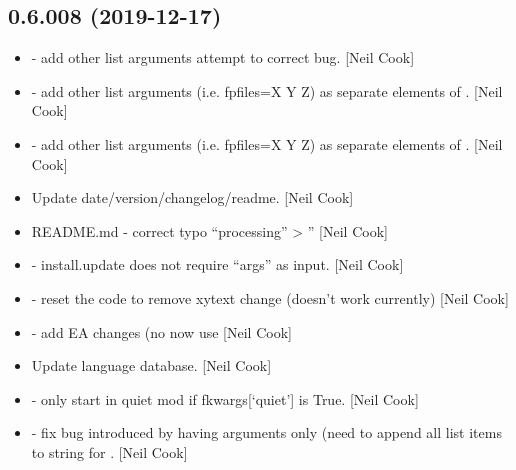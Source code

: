 \documentclass[a4paper,10pt,english]{report}
\begin{document}
\subsection{0.6.008 (2019-12-17)}
\label{\detokenize{misc/changelog:id10}}\begin{itemize}
\item {} 
 - add other list arguments \textendash{} attempt to
correct bug. {[}Neil Cook{]}

\item {} 
 - add other list arguments (i.e. \textendash{}fpfiles=X Y
Z) as separate elements of . {[}Neil Cook{]}

\item {} 
 - add other list arguments (i.e. \textendash{}fpfiles=X Y
Z) as separate elements of . {[}Neil Cook{]}

\item {} 
Update date/version/changelog/readme. {[}Neil Cook{]}

\item {} 
README.md - correct typo “processing” \textendash{}\textgreater{} ” {[}Neil
Cook{]}

\item {} 
 - install.update does not require “args” as input.
{[}Neil Cook{]}

\item {} 
 - reset the code to remove xytext change (doesn’t work
currently) {[}Neil Cook{]}

\item {} 
 - add EA changes (no  now use
 {[}Neil Cook{]}

\item {} 
Update language database. {[}Neil Cook{]}

\item {} 
 - only start in quiet mod if fkwargs{[}‘quiet’{]}
is True. {[}Neil Cook{]}

\item {} 
 - fix bug introduced by having \textendash{}arguments
only (need to append all list items to string for .
{[}Neil Cook{]}


\end{itemize}
\end{document}
